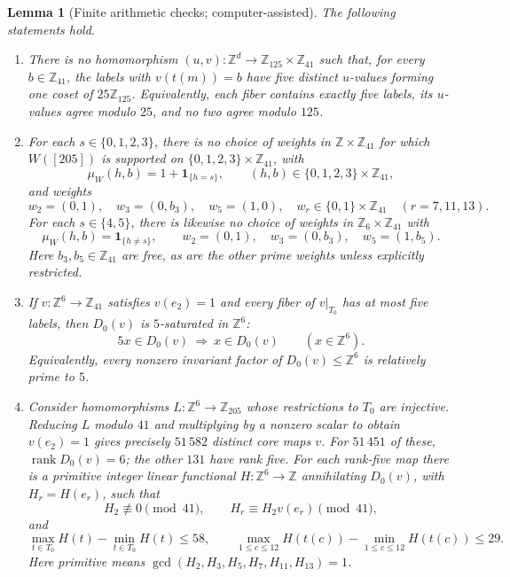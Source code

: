 \documentclass[11pt,reqno]{amsart}
\newcommand{\Z}{\mathbb Z}
\newcommand{\one}{\mathbf 1}
\newtheorem{lemma}[theorem]{Lemma}
\theoremstyle{definition}
\theoremstyle{remark}
\numberwithin{equation}{section}
\begin{document}
\begin{lemma}[Finite arithmetic checks; computer-assisted]\label{lem:205-computations}
The following statements hold.
\begin{enumerate}
\renewcommand{\theenumi}{\roman{enumi}}
\renewcommand{\labelenumi}{\textup{(\theenumi)}}
\item There is no homomorphism $(u,v):\Z^d\to\Z_{125}\times\Z_{41}$
such that, for every $b\in\Z_{41}$, the labels with $v(t(m))=b$ have
five distinct $u$-values forming one coset of $25\Z_{125}$.
Equivalently, each fiber contains exactly five labels, its $u$-values
agree modulo $25$, and no two agree modulo $125$.

\item For each $s\in\{0,1,2,3\}$, there is no choice of weights in
$\Z\times\Z_{41}$ for which $W([205])$ is supported on
$\{0,1,2,3\}\times\Z_{41}$, with
\[
 \mu_W(h,b)=1+\one_{\{h=s\}},
 \qquad (h,b)\in\{0,1,2,3\}\times\Z_{41},
\]
and weights
\[
 w_2=(0,1),\quad w_3=(0,b_3),\quad w_5=(1,0),\quad
 w_r\in\{0,1\}\times\Z_{41}\quad(r=7,11,13).
\]
For each $s\in\{4,5\}$, there is likewise no choice of weights in
$\Z_6\times\Z_{41}$ with
\[
 \mu_W(h,b)=\one_{\{h\ne s\}},\qquad
 w_2=(0,1),\quad w_3=(0,b_3),\quad w_5=(1,b_5).
\]
Here $b_3,b_5\in\Z_{41}$ are free, as are the other prime weights
unless explicitly restricted.

\item If $v:\Z^6\to\Z_{41}$ satisfies $v(e_2)=1$ and every
fiber of $v|_{T_0}$ has at most five labels, then $D_0(v)$ is
$5$-saturated in $\Z^6$:
\[
 5x\in D_0(v)\ \Longrightarrow\ x\in D_0(v)
 \qquad(x\in\Z^6).
\]
Equivalently, every nonzero invariant factor of $D_0(v)\le\Z^6$
is relatively prime to $5$.

\item Consider homomorphisms $L:\Z^6\to\Z_{205}$ whose
restrictions to $T_0$ are injective. Reducing $L$ modulo $41$ and
multiplying by a nonzero scalar to obtain $v(e_2)=1$ gives precisely
$51\,582$ distinct core maps $v$. For $51\,451$ of these,
$\operatorname{rank}D_0(v)=6$; the other $131$ have rank five.
For each rank-five map there is a primitive integer linear functional
$H:\Z^6\to\Z$ annihilating $D_0(v)$, with $H_r=H(e_r)$, such that
\[
 H_2\not\equiv0\pmod{41},\qquad H_r\equiv H_2v(e_r)\pmod{41},
\]
and
\[
 \max_{t\in T_0}H(t)-\min_{t\in T_0}H(t)\le58,
 \qquad
 \max_{1\le c\le12}H(t(c))-\min_{1\le c\le12}H(t(c))\le29.
\]
Here primitive means $\gcd(H_2,H_3,H_5,H_7,H_{11},H_{13})=1$.
\end{enumerate}
\end{lemma}
\end{document}
